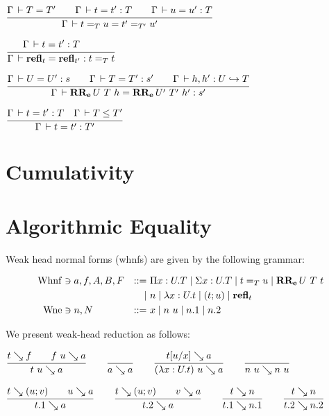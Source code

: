 \documentclass[a4paper,english]{lipics-utf8x}
\begin{document}
\begin{center}
\(
  \ru{\Gamma \der T = T' \qquad
      \Gamma \der t = t' : T \qquad
      \Gamma \der u = u' : T
    }{\Gamma \der t =_T u = t' =_{T'} u'}
\)
\end{center}

\begin{center}
\(
  \ru{\Gamma \der t = t' : T \qquad
    }{\Gamma \der \refl_t = \refl_{t'} : t =_T t}
\)
\end{center}

\begin{center}
\(
  \ru{\Gamma \der U = U' : s \qquad
      \Gamma \der T = T' : s' \qquad
      \Gamma \der h, h' : \emb{U}{T}
    }{\Gamma \der \RRe{U}{T}{h} = \RRe{U'}{T'}{h'} : s'}
\)
\end{center}


\begin{center}
\(
  \ru{\Gamma \der t = t' : T \quad
      \Gamma \der T \le T'
    }{\Gamma \der t = t' : T'}
\)
\end{center}


\section{Cumulativity}

\section{Algorithmic Equality}


Weak head normal forms (whnfs) are given by the following grammar:

\begin{align*}
  \operatorname{Whnf} &\ni a,f,A,B,F &::=~& \Pi x:U.T \mid \Sigma x:U.T \mid t =_T u
                         \mid \operatorname{\mathbf{RR_e}}U\ T\ t \\
      &&\mid~& n \mid \lambda x:U.t \mid (t;u) \mid \operatorname{\mathbf{refl}}_t \\
  \operatorname{Wne}  &\ni n,N &::=~& x \mid n~u \mid n.1 \mid n.2
\end{align*}

We present weak-head reduction as follows:

\begin{center}
\(
  \ru{t \rew f \qquad
      f~u \rew a
    }{t~u \rew a}
  \qquad
  \ru{}{a \rew a}
  \qquad
  \ru{t[u/x] \rew a
    }{(\lambda x:U.t)~u \rew a}
  \qquad
  \ru{}{n~u \rew n~u}
\)
\end{center}

\begin{center}
\(
  \ru{t \rew (u;v) \qquad
      u \rew a
    }{t.1 \rew a}
  \qquad
  \ru{t \rew (u;v) \qquad
      v \rew a
    }{t.2 \rew a}
  \qquad
  \ru{t \rew n
    }{t.1 \rew n.1}
  \qquad
  \ru{t \rew n
    }{t.2 \rew n.2}
\)
\end{center}
\end{document}
